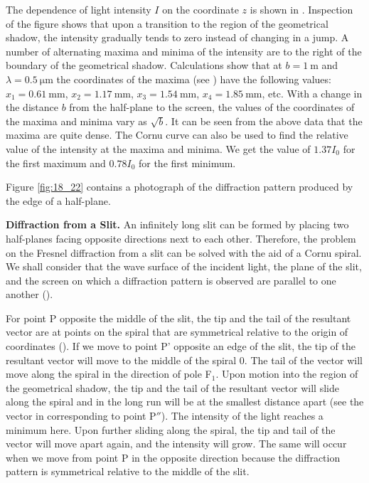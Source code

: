 The dependence of light intensity $I$ on the coordinate $z$ is shown in .
Inspection of the figure shows that upon a transition to the region of the geometrical shadow, the intensity gradually tends to zero instead of changing in a jump.
A number of alternating maxima and minima of the intensity are to the right of the boundary of the geometrical shadow.
Calculations show that at $b=\SI{1}{\metre}$ and $\lambda=\SI{0.5}{\micro\metre}$ the coordinates of the maxima (see ) have the following values: $x_1=\SI{0.61}{\milli\metre}$, $x_2=\SI{1.17}{\milli\metre}$, $x_3=\SI{1.54}{\milli\metre}$, $x_4=\SI{1.85}{\milli\metre}$, etc.
With a change in the distance $b$ from the half-plane to the screen, the values of the coordinates of the maxima and minima vary as $\sqrt{b}$.
It can be seen from the above data that the maxima are quite dense.
The Cornu curve can also be used to find the relative value of the intensity at the maxima and
minima.
We get the value of $1.37 I_0$ for the first maximum and $0.78 I_0$ for the first minimum.

Figure \ref{fig:18_22} contains a photograph of the diffraction pattern produced by the edge of a half-plane.

\textbf{Diffraction from a Slit.}
An infinitely long slit can be formed by placing two half-planes facing opposite directions next to each other.
Therefore, the problem on the Fresnel diffraction from a slit can be solved with the aid of a Cornu spiral.
We shall consider that the wave surface of the incident light, the plane of the slit, and the screen on which a diffraction pattern is observed are parallel to one another ().

For point P opposite the middle of the slit, the tip and the tail of the resultant vector are at points on the spiral that are symmetrical relative to the origin of coordinates ().
If we move to point P' opposite an edge of
the slit, the tip of the resultant vector
will move to the middle of the spiral $0$.
The tail of the vector will move along the spiral in the direction of pole F$_1$.
Upon motion into the region of the geometrical shadow, the tip and the tail of the resultant vector will slide along the spiral and in the long run will be at the smallest distance apart (see the vector in  corresponding to point P$''$).
The intensity of the light reaches a minimum here.
Upon further sliding along the spiral, the tip and tail of the vector will move apart again, and the intensity will grow.
The same will occur when we move from point P in the opposite direction because the diffraction pattern is symmetrical relative to the middle of the slit.

